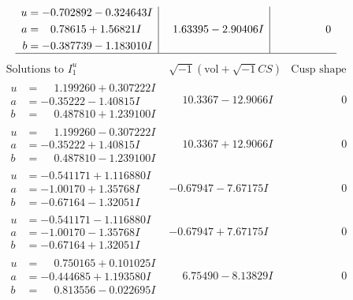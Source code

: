 \documentclass[1p]{elsarticle_modified}
\theoremstyle{definition}
\newcommand{\I}{\sqrt{-1}}
\begin{document}
$$\begin{array}{c|c|c}
\begin{aligned}
u &= -0.702892 - 0.324643 I \\
a &= \phantom{-}0.78615 + 1.56821 I \\
b &= -0.387739 - 1.183010 I\end{aligned}
 & \phantom{-}1.63395 - 2.90406 I & \phantom{-0.000000 } 0\\
 \hline 
 \end{array}$$\newpage$$\begin{array}{c|c|c}  
\text{Solutions to }I^u_{1}& \I (\text{vol} + \sqrt{-1}CS) & \text{Cusp shape}\\
 \hline 
\begin{aligned}
u &= \phantom{-}1.199260 + 0.307222 I \\
a &= -0.35222 - 1.40815 I \\
b &= \phantom{-}0.487810 + 1.239100 I\end{aligned}
 & \phantom{-}10.3367 - 12.9066 I & \phantom{-0.000000 } 0 \\ \hline\begin{aligned}
u &= \phantom{-}1.199260 - 0.307222 I \\
a &= -0.35222 + 1.40815 I \\
b &= \phantom{-}0.487810 - 1.239100 I\end{aligned}
 & \phantom{-}10.3367 + 12.9066 I & \phantom{-0.000000 } 0 \\ \hline\begin{aligned}
u &= -0.541171 + 1.116880 I \\
a &= -1.00170 + 1.35768 I \\
b &= -0.67164 - 1.32051 I\end{aligned}
 & -0.67947 - 7.67175 I & \phantom{-0.000000 } 0 \\ \hline\begin{aligned}
u &= -0.541171 - 1.116880 I \\
a &= -1.00170 - 1.35768 I \\
b &= -0.67164 + 1.32051 I\end{aligned}
 & -0.67947 + 7.67175 I & \phantom{-0.000000 } 0 \\ \hline\begin{aligned}
u &= \phantom{-}0.750165 + 0.101025 I \\
a &= -0.444685 + 1.193580 I \\
b &= \phantom{-}0.813556 - 0.022695 I\end{aligned}
 & \phantom{-}6.75490 - 8.13829 I & \phantom{-0.000000 } 0 \\ \hline\begin{aligned}

\end{aligned}
\end{array}$$
\end{document}
